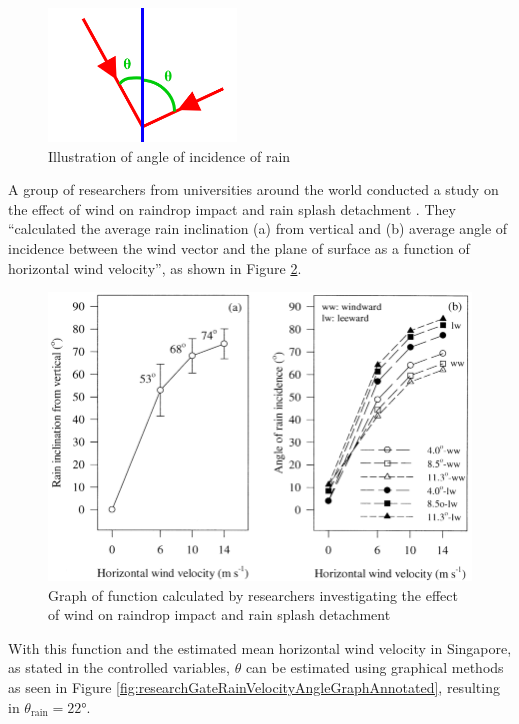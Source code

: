 \documentclass[a4paper,titlepage]{article}
\begin{document}
\begin{figure}[htbp]
    \centering
    \includegraphics[width=5cm]{angleOfIncidenceOfRain.png}
    \caption{Illustration of angle of incidence of rain}
    \label{fig:angleOfIncidenceOfRain}
\end{figure}

A group of researchers from universities around the world conducted a study on the effect of wind on raindrop impact and rain splash detachment \cite{erpul_darrell_gabriels-rainvelocityangle}. They ``calculated the average rain inclination (a) from vertical and (b) average angle of incidence between the wind vector and the plane of surface as a function of horizontal wind velocity'', as shown in Figure \ref{fig:researchGateRainVelocityAngleGraph}.

\begin{figure}[htbp]
    \centering
    \includegraphics[width=\textwidth]{researchGateRainVelocityAngleGraph.png}
    \caption{Graph of function calculated by researchers investigating the effect of wind on raindrop impact and rain splash detachment}
    \label{fig:researchGateRainVelocityAngleGraph}
\end{figure}

With this function and the estimated mean horizontal wind velocity in Singapore, as stated in the controlled variables, $\theta$ can be estimated using graphical methods as seen in Figure \ref{fig:researchGateRainVelocityAngleGraphAnnotated}, resulting in $\theta_\text{rain}=22\si{\degree}$.
\end{document}
